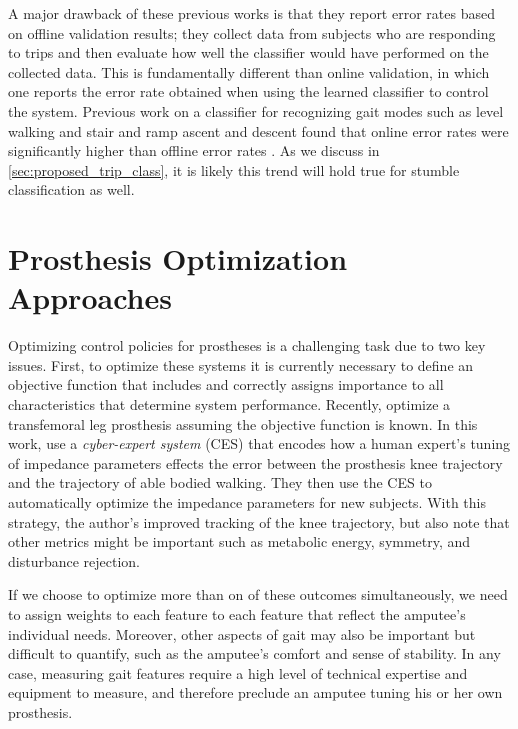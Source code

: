 A major drawback of these previous works is that they report error rates based
on offline validation results; \ie they collect data from subjects who are
responding to trips and then evaluate how well the classifier would have
performed on the collected data. This is fundamentally different than online
validation, in which one reports the error rate obtained when using the
learned classifier to control the system. Previous work on a classifier for
recognizing gait modes such as level walking and stair and ramp ascent and
descent found that online error rates were significantly higher than offline
error rates \citep{hargrove2015intuitive}. As we discuss in
\cref{sec:proposed_trip_class}, it is likely this trend will hold true for
stumble classification as well.

\section{Prosthesis Optimization Approaches}\label{sec:back_optimization}
Optimizing control policies for prostheses is a challenging task due to two key
issues. First, to optimize these systems it is currently necessary to define an
objective function that includes and correctly assigns importance to all
characteristics that determine system performance. Recently,
\citet{huang2016cyber} optimize a transfemoral leg prosthesis assuming the
objective function is known.  In this work, \citeauthor{huang2016cyber} use a
\emph{cyber-expert system} (CES) that encodes how a human expert's tuning of
impedance parameters effects the error between the prosthesis knee trajectory
and the trajectory of able bodied walking. They then use the CES to
automatically optimize the impedance parameters for new subjects. With this
strategy, the author's improved tracking of the knee trajectory, but also note
that other metrics might be important such as metabolic energy, symmetry, and
disturbance rejection.
 
If we choose to optimize more than on of these outcomes simultaneously, we need
to assign weights to each feature to each feature that reflect the amputee's
individual needs. Moreover, other aspects of gait may also be important but
difficult to quantify, such as the amputee's comfort and sense of stability. In
any case, measuring gait features require a high level of technical expertise
and equipment to measure, and therefore preclude an amputee tuning his or her
own prosthesis.


